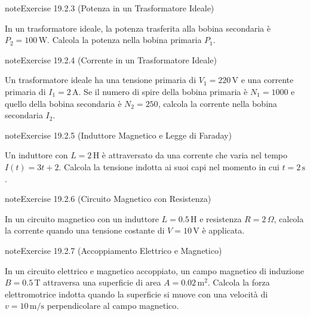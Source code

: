 \documentclass[letterpaper,10pt,italian]{jupyterBook}
\begin{document}
\begin{sphinxadmonition}{note}{Exercise 19.2.3 (Potenza in un Trasformatore Ideale)}



\sphinxAtStartPar
In un trasformatore ideale, la potenza trasferita alla bobina secondaria è \(P_2 = 100 \, \text{W}\). Calcola la potenza nella bobina primaria \(P_1\).
\end{sphinxadmonition}
 \label{exercise:ch/electromagnetism/circuits-magnetic-problems-exercise-3}

\begin{sphinxadmonition}{note}{Exercise 19.2.4 (Corrente in un Trasformatore Ideale)}



\sphinxAtStartPar
Un trasformatore ideale ha una tensione primaria di \(V_1 = 220 \, \text{V}\) e una corrente primaria di \(I_1 = 2 \, \text{A}\). Se il numero di spire della bobina primaria è \(N_1 = 1000\) e quello della bobina secondaria è \(N_2 = 250\), calcola la corrente nella bobina secondaria \(I_2\).
\end{sphinxadmonition}
 \label{exercise:ch/electromagnetism/circuits-magnetic-problems-exercise-4}

\begin{sphinxadmonition}{note}{Exercise 19.2.5 (Induttore Magnetico e Legge di Faraday)}



\sphinxAtStartPar
Un induttore con \(L = 2 \, \text{H}\) è attraversato da una corrente che varia nel tempo \(I(t) = 3t + 2\). Calcola la tensione indotta ai suoi capi nel momento in cui \(t = 2 \, \text{s}\).
\end{sphinxadmonition}
 \label{exercise:ch/electromagnetism/circuits-magnetic-problems-exercise-5}

\begin{sphinxadmonition}{note}{Exercise 19.2.6 (Circuito Magnetico con Resistenza)}



\sphinxAtStartPar
In un circuito magnetico con un induttore \(L = 0.5 \, \text{H}\) e resistenza \(R = 2 \, \Omega\), calcola la corrente quando una tensione costante di \(V = 10 \, \text{V}\) è applicata.
\end{sphinxadmonition}
 \label{exercise:ch/electromagnetism/circuits-magnetic-problems-exercise-6}

\begin{sphinxadmonition}{note}{Exercise 19.2.7 (Accoppiamento Elettrico e Magnetico)}



\sphinxAtStartPar
In un circuito elettrico e magnetico accoppiato, un campo magnetico di induzione \(B = 0.5 \, \text{T}\) attraversa una superficie di area \(A = 0.02 \, \text{m}^2\). Calcola la forza elettromotrice indotta quando la superficie si muove con una velocità di \(v = 10 \, \text{m/s}\) perpendicolare al campo magnetico.
\end{sphinxadmonition}
 \label{exercise:ch/electromagnetism/circuits-magnetic-problems-exercise-7}
\end{document}
